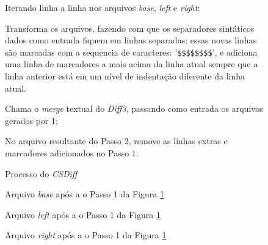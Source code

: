 \begin{figure}[ht]
	\begin{center}
		\begin{compactenum}[(1)]
			\item Iterando linha a linha nos arquivos \emph{base}, \emph{left} e \emph{right}:
			\begin{compactenum}
				\item Transforma os arquivos, fazendo com que os separadores sintáticos
				dados como entrada fiquem em linhas separadas; essas novas linhas são marcadas com a sequencia de caracteres:
				'\verb|$$$$$$$$|', e adiciona uma linha de marcadores a mais acima da linha atual
				sempre que a linha anterior está em um nível de
				indentação diferente da linha atual.
			\end{compactenum}
			\item Chama o \emph{merge} textual do \emph{Diff3}, passando como entrada os arquivos gerados por 1;
			\item No arquivo resultante do Passo 2, remove as linhas extras e marcadores adicionados no Passo 1.
		\end{compactenum}
	\end{center}
	\caption{Processo do \emph{CSDiff}}\label{csdiff_process_indentation}
\end{figure}


\begin{figure}[ht]
	\begin{center}
		
		\caption{Arquivo \emph{base} após a o Passo 1 da Figura
			\ref{csdiff_process_indentation}}\label{base_marcadores_indentacao}
	\end{center}
\end{figure}

\begin{figure}[ht]
	\begin{center}
		
		\caption{Arquivo \emph{left} após a o Passo 1 da Figura
			\ref{csdiff_process_indentation}}\label{left_marcadores_indentacao}
	\end{center}
\end{figure}

\begin{figure}[ht]
	\begin{center}
		
		\caption{Arquivo \emph{right} após a o Passo 1 da Figura
			\ref{csdiff_process_indentation}}\label{right_marcadores_indentacao}
	\end{center}
\end{figure}

